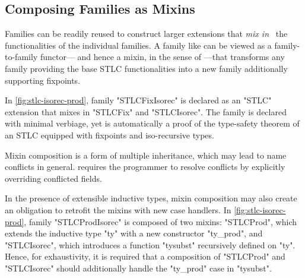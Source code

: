 


\subsection{Composing Families as Mixins}


Families can be readily reused to construct larger extensions that
\emph{mix in}~\cite{mixin-1990} the functionalities of the individual
families.
A family like  can be viewed as a family-to-family functor---%
and hence a mixin, in the sense of \cite{flatt1998mixin}---that
transforms any family providing the base STLC functionalities into a new
family additionally supporting fixpoints.

In \cref{fig:stlc-isorec-prod}, family "STLCFixIsorec" is declared as
an "STLC" extension that mixes in "STLCFix" and "STLCIsorec".
The family is declared with minimal verbiage, yet
 is automatically a proof of the type-safety
theorem of an STLC equipped with fixpoints and iso-recursive types.

Mixin composition is a form of multiple inheritance, which may lead to
name conflicts in general.
\Lang requires the programmer to resolve conflicts by
explicitly overriding conflicted fields.

In the presence of extensible inductive types, mixin composition may
also create an obligation to retrofit the mixins with new case handlers.
In \cref{fig:stlc-isorec-prod}, family "STLCProdIsorec" is composed
of two mixins: "STLCProd", which extends the inductive type "ty" with a
new constructor "ty_prod", and "STLCIsorec", which introduces a
function "tysubst" recursively defined on "ty".
Hence, for exhaustivity, it is required that a composition of
"STLCProd" and "STLCIsorec" should additionally handle the "ty_prod"
case in "tysubst".

%
%
%
%
%
%


